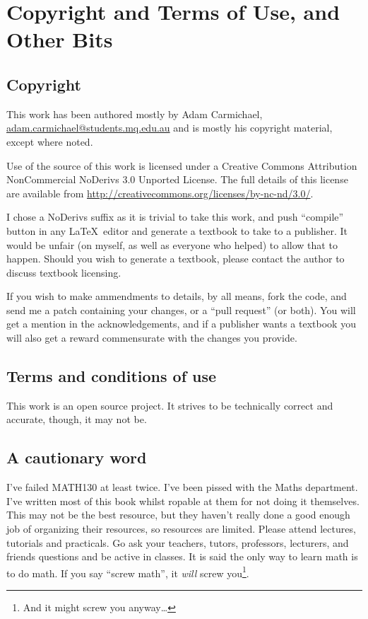 \chapter{Copyright and Terms of Use, and Other Bits}
\label{chap:Copyright}
\section{Copyright}
This work has been authored mostly by Adam Carmichael,
\url{adam.carmichael@students.mq.edu.au} and is mostly his copyright material,
except where noted.

Use of the source of this work is licensed under a Creative Commons
Attribution NonCommercial NoDerivs 3.0 Unported License. The full details of
this license are available from
\url{http://creativecommons.org/licenses/by-nc-nd/3.0/}.

I chose a NoDerivs suffix as it is trivial to take this work, and push
``compile'' button in any \LaTeX~editor and generate a textbook to take to a
publisher. It would be unfair (on myself, as well as everyone who helped) to
allow that to happen. Should you wish to generate a textbook, please contact the
author to discuss textbook licensing.

If you wish to make ammendments to details, by all means, fork the code, and
send me a patch containing your changes, or a ``pull request'' (or both). You
will get a mention in the acknowledgements, and if a publisher wants a textbook
you will also get a reward commensurate with the changes you provide.

\section{Terms and conditions of use}
This work is an open source project. It strives to be technically correct and
accurate, though, it may not be.

\section{A cautionary word}
I've failed MATH130 at least twice. I've been pissed with the Maths
department. I've written most of this book whilst ropable at them for not doing
it themselves. This may not be the best resource, but they haven't really done a
good enough job of organizing their resources, so resources are limited. Please
attend lectures, tutorials and practicals. Go ask your teachers, tutors,
professors, lecturers, and friends questions and be active in classes. It is
said the only way to learn math is to do math. If you say ``screw math'', it
\emph{will} screw you\footnote{And it might screw you anyway\ldots}.

